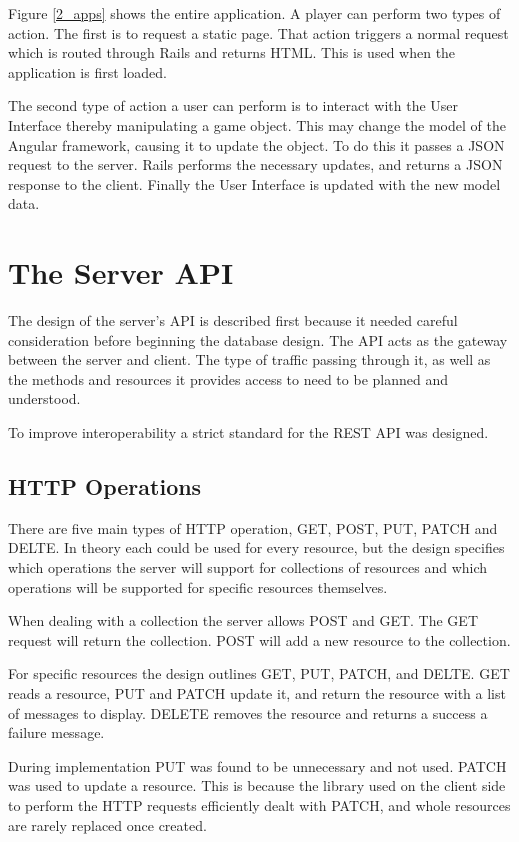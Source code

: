 Figure \ref{2_apps} shows the entire application. A player can perform two types of action. The first is to request a static page. That action triggers a normal request which is routed through Rails and returns HTML. This is used when the application is first loaded.

The second type of action a user can perform is to interact with the User Interface thereby manipulating a game object. This may change the model of the Angular framework, causing it to update the object. To do this it passes a JSON request to the server. Rails performs the necessary updates, and returns a JSON response to the client. Finally the User Interface is updated with the new model data.


\section{The Server API}
The design of the server's API is described first because it needed careful consideration before beginning the database design. The API acts as the gateway between the server and client. The type of traffic passing through it, as well as the methods and resources it provides access to need to be planned and understood.

To improve interoperability a strict standard for the REST API was designed.

\subsection{HTTP Operations}
There are five main types of HTTP operation, GET, POST, PUT, PATCH and DELTE. In theory each could be used for every resource, but the design specifies which operations the server will support for collections of resources and which operations will be supported for specific resources themselves.

When dealing with a collection the server allows POST and GET. The GET request will return the collection. POST will add a new resource to the collection.

For specific resources the design outlines GET, PUT, PATCH, and DELTE. GET reads a resource, PUT and PATCH update it, and return the resource with a list of messages to display. DELETE removes the resource and returns a success a failure message.

During implementation PUT was found to be unnecessary and not used. PATCH was used to update a resource. This is because the library used on the client side to perform the HTTP requests efficiently dealt with PATCH, and whole resources are rarely replaced once created.

